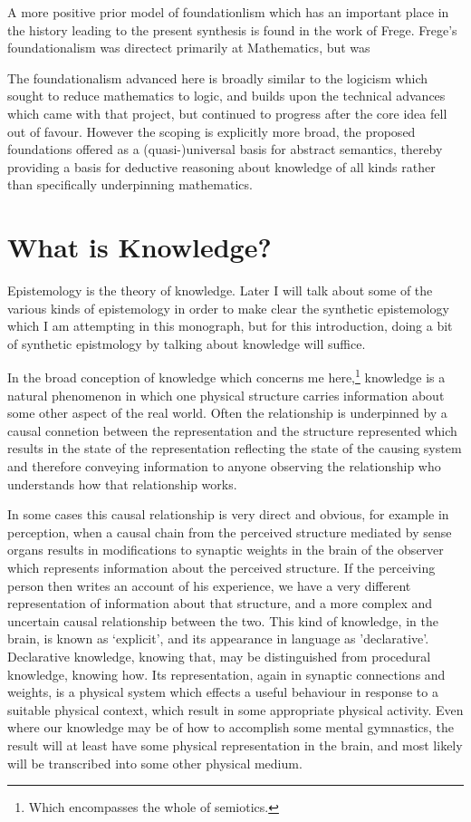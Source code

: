 A more positive prior model of foundationlism which has an important place in the history leading to the present synthesis is found in the work of Frege.
Frege's foundationalism was directect primarily at Mathematics, but was 



The foundationalism advanced here is broadly similar to the logicism which sought to reduce mathematics to logic, and builds upon the technical advances which came with that project, but continued to progress after the core idea fell out of favour.
  However the scoping is explicitly more broad, the proposed foundations offered as a (quasi-)universal basis for abstract semantics, thereby providing a basis for deductive reasoning about knowledge of all kinds rather than specifically underpinning mathematics.
  


\section{What is Knowledge?}

Epistemology is the theory of knowledge.
Later I will talk about some of the various kinds of epistemology in order to make clear the synthetic epistemology which I am attempting in this monograph, but for this introduction, doing a bit of synthetic epistmology by talking about knowledge will suffice.

In the broad conception of knowledge which concerns me here,\footnote{Which encompasses the whole of semiotics.} knowledge is a natural phenomenon in which one physical structure carries information about some other aspect of the real world.
Often the relationship is underpinned by a causal connetion between the representation and the structure represented which results in the state of the representation reflecting the state of the causing system and therefore conveying information to anyone observing the relationship who understands how that relationship works.

In some cases this causal relationship is very direct and obvious, for example in perception, when a causal chain from the perceived structure mediated by sense organs results in modifications to synaptic weights in the brain of the observer which represents information about the perceived structure.
If the perceiving person then writes an account of his experience, we have a very different representation of information about that structure, and a more complex and uncertain causal relationship between the two.
This kind of knowledge, in the brain, is known as `explicit', and its appearance in language as 'declarative'.
Declarative knowledge, knowing that, may be distinguished from procedural knowledge, knowing how.
Its representation, again in synaptic connections and weights, is a physical system which effects a useful behaviour in response to a suitable physical context, which result in some appropriate physical activity.
Even where our knowledge may be of how to accomplish some mental gymnastics, the result will at least have some physical representation in the brain, and most likely will be transcribed into some other physical medium.

